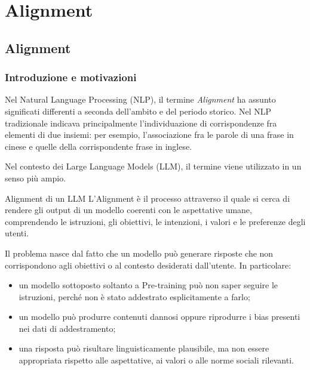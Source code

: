\chapter{Alignment}
%
%
%



\section{Alignment}

\subsection*{Introduzione e motivazioni}

Nel Natural Language Processing (NLP), il termine
\emph{Alignment} ha assunto significati differenti a seconda
dell'ambito e del periodo storico. Nel NLP tradizionale indicava
principalmente l'individuazione di corrispondenze fra elementi di
due insiemi: per esempio, l'associazione fra le parole di una frase
in cinese e quelle della corrispondente frase in inglese.

Nel contesto dei Large Language Models (LLM), il termine viene
utilizzato in un senso più ampio.

\begin{definition}{Alignment di un LLM}
L'Alignment è il processo attraverso il quale si cerca di rendere
gli output di un modello coerenti con le aspettative umane,
comprendendo le istruzioni, gli obiettivi, le intenzioni,
i valori e le preferenze degli utenti.
\end{definition}

Il problema nasce dal fatto che un modello può generare risposte
che non corrispondono agli obiettivi o al contesto desiderati
dall'utente. In particolare:

\begin{itemize}
    \item un modello sottoposto soltanto a Pre-training può non
    saper seguire le istruzioni, perché non è stato addestrato
    esplicitamente a farlo;

    \item un modello può produrre contenuti dannosi oppure
    riprodurre i bias presenti nei dati di addestramento;

    \item una risposta può risultare linguisticamente plausibile,
    ma non essere appropriata rispetto alle aspettative,
    ai valori o alle norme sociali rilevanti.
\end{itemize}

